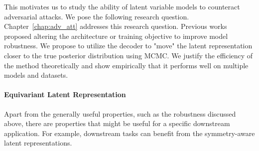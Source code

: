 This motivates us to study the ability of latent variable models to counteract adversarial attacks. We pose the following research question.
Chapter~\ref{chap:adv_att} addresses this research question.
Previous works proposed altering the architecture or training objective to improve model robustness. 
We propose to utilize the decoder to "move" the latent representation closer to the true posterior distribution using MCMC. 
We justify the efficiency of the method theoretically and show empirically that it performs well on multiple models and datasets. 

\paragraph{Equivariant Latent Representation}
Apart from the generally useful properties, such as the robustness discussed above, there are properties that might be useful for a specific downstream application. 
For example, downstream tasks can benefit from the symmetry-aware latent representations. 

